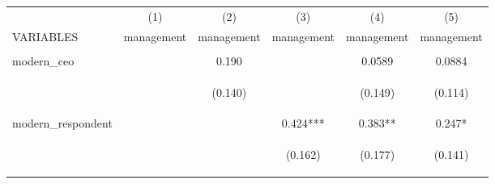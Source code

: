 \begin{center}
\begin{tabular}{lccccc} \hline
 & (1) & (2) & (3) & (4) & (5) \\
VARIABLES & management & management & management & management & management \\ \hline
\vspace{4pt} & \begin{footnotesize}\end{footnotesize} & \begin{footnotesize}\end{footnotesize} & \begin{footnotesize}\end{footnotesize} & \begin{footnotesize}\end{footnotesize} & \begin{footnotesize}\end{footnotesize} \\
modern\_ceo &  & 0.190 &  & 0.0589 & 0.0884 \\
\vspace{4pt} & \begin{footnotesize}\end{footnotesize} & \begin{footnotesize}(0.140)\end{footnotesize} & \begin{footnotesize}\end{footnotesize} & \begin{footnotesize}(0.149)\end{footnotesize} & \begin{footnotesize}(0.114)\end{footnotesize} \\
modern\_respondent &  &  & 0.424*** & 0.383** & 0.247* \\
\vspace{4pt} & \begin{footnotesize}\end{footnotesize} & \begin{footnotesize}\end{footnotesize} & \begin{footnotesize}(0.162)\end{footnotesize} & \begin{footnotesize}(0.177)\end{footnotesize} & \begin{footnotesize}(0.141)\end{footnotesize} \\

\end{tabular}
\end{center}
